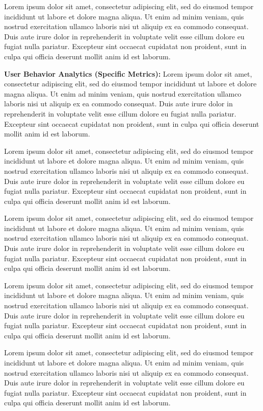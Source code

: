 \documentclass[12pt]{article}
\begin{document}
Lorem ipsum dolor sit amet, consectetur adipiscing elit, sed do eiusmod tempor incididunt ut labore et dolore magna aliqua. Ut enim ad minim veniam, quis nostrud exercitation ullamco laboris nisi ut aliquip ex ea commodo consequat. Duis aute irure dolor in reprehenderit in voluptate velit esse cillum dolore eu fugiat nulla pariatur. Excepteur sint occaecat cupidatat non proident, sunt in culpa qui officia deserunt mollit anim id est laborum.

\textbf{User Behavior Analytics (Specific Metrics):} Lorem ipsum dolor sit amet, consectetur adipiscing elit, sed do eiusmod tempor incididunt ut labore et dolore magna aliqua. Ut enim ad minim veniam, quis nostrud exercitation ullamco laboris nisi ut aliquip ex ea commodo consequat. Duis aute irure dolor in reprehenderit in voluptate velit esse cillum dolore eu fugiat nulla pariatur. Excepteur sint occaecat cupidatat non proident, sunt in culpa qui officia deserunt mollit anim id est laborum.

Lorem ipsum dolor sit amet, consectetur adipiscing elit, sed do eiusmod tempor incididunt ut labore et dolore magna aliqua. Ut enim ad minim veniam, quis nostrud exercitation ullamco laboris nisi ut aliquip ex ea commodo consequat. Duis aute irure dolor in reprehenderit in voluptate velit esse cillum dolore eu fugiat nulla pariatur. Excepteur sint occaecat cupidatat non proident, sunt in culpa qui officia deserunt mollit anim id est laborum.

Lorem ipsum dolor sit amet, consectetur adipiscing elit, sed do eiusmod tempor incididunt ut labore et dolore magna aliqua. Ut enim ad minim veniam, quis nostrud exercitation ullamco laboris nisi ut aliquip ex ea commodo consequat. Duis aute irure dolor in reprehenderit in voluptate velit esse cillum dolore eu fugiat nulla pariatur. Excepteur sint occaecat cupidatat non proident, sunt in culpa qui officia deserunt mollit anim id est laborum.

Lorem ipsum dolor sit amet, consectetur adipiscing elit, sed do eiusmod tempor incididunt ut labore et dolore magna aliqua. Ut enim ad minim veniam, quis nostrud exercitation ullamco laboris nisi ut aliquip ex ea commodo consequat. Duis aute irure dolor in reprehenderit in voluptate velit esse cillum dolore eu fugiat nulla pariatur. Excepteur sint occaecat cupidatat non proident, sunt in culpa qui officia deserunt mollit anim id est laborum.

Lorem ipsum dolor sit amet, consectetur adipiscing elit, sed do eiusmod tempor incididunt ut labore et dolore magna aliqua. Ut enim ad minim veniam, quis nostrud exercitation ullamco laboris nisi ut aliquip ex ea commodo consequat. Duis aute irure dolor in reprehenderit in voluptate velit esse cillum dolore eu fugiat nulla pariatur. Excepteur sint occaecat cupidatat non proident, sunt in culpa qui officia deserunt mollit anim id est laborum.
\end{document}
